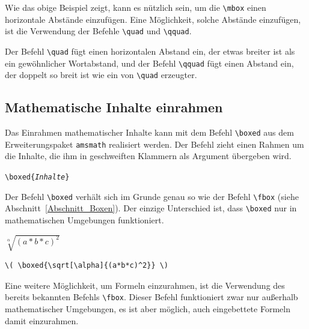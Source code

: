 \documentclass[a4paper,10pt,twoside]{scrbook}
\begin{document}
Wie das obige Beispiel zeigt, kann es nützlich sein,
um die \verb!\mbox! einen horizontale Abstände einzufügen.
Eine Möglichkeit, solche Abstände einzufügen, ist die Verwendung der Befehle 
\verb!\quad! und \verb!\qquad!.


Der Befehl \verb!\quad!  
fügt einen horizontalen 
Abstand ein, der etwas breiter ist
als ein gewöhnlicher Wortabstand, und der 
Befehl \verb!\qquad!  
fügt einen Abstand 
ein, der doppelt so breit ist wie
ein von \verb!\quad! erzeugter.



\subsection{Mathematische Inhalte einrahmen}

Das Einrahmen mathematischer Inhalte kann mit dem 
Befehl \verb!\boxed!  
aus dem Erweiterungspaket \verb!amsmath! 
realisiert werden. Der Befehl zieht einen Rahmen 
um die Inhalte, die ihm in geschweiften
Klammern als Argument übergeben wird. 

\texttt{\textbackslash boxed\{\textsl{Inhalte}\}}

Der Befehl \verb!\boxed!
verhält sich im 
Grunde genau so wie der 
Befehl \verb!\fbox! 
(siehe Abschnitt~\ref{Abschnitt_Boxen}).
Der einzige Unterschied ist, dass \verb!\boxed! nur
in mathematischen Umgebungen funktioniert.



\begin{minipage}[c]{.38\textwidth}
\setlength{\parskip}{1em}
\centering
\( \boxed{\sqrt[\alpha]{(a*b*c)^2}} \)
\end{minipage}
\hfill
\begin{minipage}[c]{.6\textwidth}
\setlength{\parskip}{1em}
\begin{lstlisting}[label=boxedbeispiel, style=customlatex]
\( \boxed{\sqrt[\alpha]{(a*b*c)^2}} \)
\end{lstlisting}
\end{minipage}


Eine weitere Möglichkeit, um Formeln 
einzurahmen, ist die Verwendung des bereits bekannten Befehls \verb!\fbox!.
Dieser Befehl funktioniert zwar nur außerhalb mathematischer Umgebungen,
es ist aber möglich, auch eingebettete Formeln damit einzurahmen.
\end{document}
